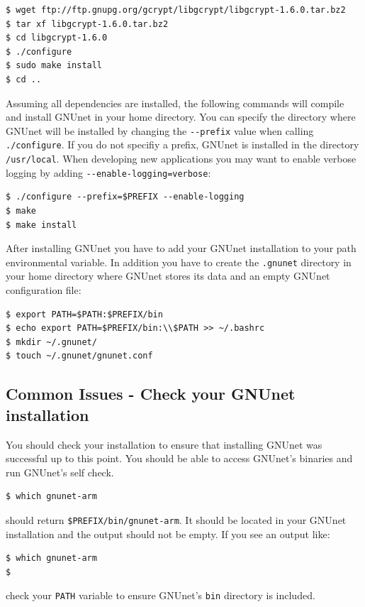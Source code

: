 \documentclass[10pt]{article}
\begin{document}
\lstset{language=bash}
\begin{lstlisting}
$ wget ftp://ftp.gnupg.org/gcrypt/libgcrypt/libgcrypt-1.6.0.tar.bz2
$ tar xf libgcrypt-1.6.0.tar.bz2
$ cd libgcrypt-1.6.0
$ ./configure
$ sudo make install
$ cd ..
\end{lstlisting}

\label{sub:install}
Assuming all dependencies are installed, the following commands will
compile and install GNUnet in your home directory. You can specify the
directory where GNUnet will be installed by changing the
\lstinline|--prefix| value when calling \lstinline|./configure|.  If
you do not specifiy a prefix, GNUnet is installed in the directory
\lstinline|/usr/local|. When developing new applications you may want
to enable verbose logging by adding
\lstinline|--enable-logging=verbose|:

\lstset{language=bash}
\begin{lstlisting}
$ ./configure --prefix=$PREFIX --enable-logging
$ make
$ make install
\end{lstlisting}

After installing GNUnet you have to add your GNUnet installation to your path
environmental variable. In addition you have to create the \lstinline|.gnunet|
directory in your home directory where GNUnet stores its data and an empty
GNUnet configuration file:

\lstset{language=bash}
\begin{lstlisting}
$ export PATH=$PATH:$PREFIX/bin
$ echo export PATH=$PREFIX/bin:\\$PATH >> ~/.bashrc
$ mkdir ~/.gnunet/
$ touch ~/.gnunet/gnunet.conf
\end{lstlisting}

\subsection{Common Issues - Check your GNUnet installation}
You should check your installation to ensure that installing GNUnet
was successful up to this point. You should be able to access GNUnet's
binaries and run GNUnet's self check.
\begin{lstlisting}
$ which gnunet-arm
\end{lstlisting}
should return \lstinline|$PREFIX/bin/gnunet-arm|. It should be
located in your GNUnet installation and the output should not be
empty. If you see an output like:
\begin{lstlisting}
$ which gnunet-arm
$
\end{lstlisting}
check your {\tt PATH} variable to ensure GNUnet's {\tt bin} directory is included.
\end{document}
